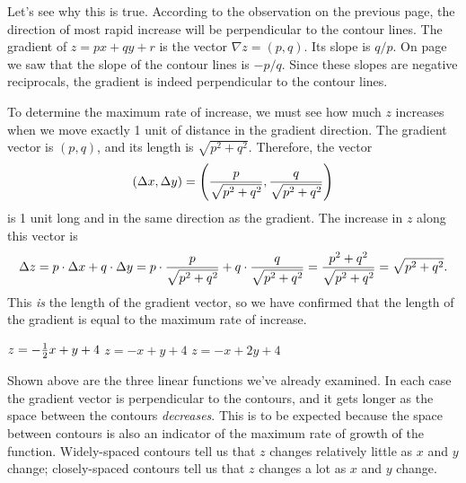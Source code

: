 {{{{\begin{center}
\end{center}

	Let's see why this is true.   
According to the observation on the previous page, the direction of most rapid increase will be perpendicular to the contour lines.  The gradient of $z = px + qy + r$ is the vector $\nabla z = (p, q)$.  Its slope is $q/p$.  On page~\pageref{contourslope} we saw that the slope of the contour lines is $-p/q$.  Since these slopes are negative reciprocals, the gradient is indeed perpendicular to the contour lines.
\label{grad}   

	To determine the maximum rate of increase, we must see how much $z$ increases when we move exactly 1 unit of distance in the gradient direction.  The gradient vector is $(p, q)$, and its length is $\sqrt{p^2 + q^2}$.  Therefore, the vector
	\[
(\Delta x, \Delta y) = 
	\left( {p \over \sqrt{p^2 + q^2}}, {q \over \sqrt{p^2 + q^2}} \right)
\]
is 1 unit long and in the same direction as the gradient.  The increase in $z$ along this vector is
	\[
\Delta z = p \cdot \Delta x + q \cdot \Delta y =
	p \cdot {p \over \sqrt{p^2 + q^2}} + q \cdot {q \over \sqrt{p^2 + q^2}}
	= {p^2 + q^2 \over \sqrt{p^2 + q^2}} = \sqrt{p^2 + q^2}.
\]
This {\em is\/} the length of the gradient vector, 
so we have confirmed that the length of the gradient is equal to the maximum rate of increase.
	
\vspace{13pt}	
\vspace{138pt}

{\small
	\noindent
	\hspace{-33pt}
	$z = -{\textstyle {1 \over 2}} x  + y + 4$
	\hspace{63pt}
	$z = -x + y + 4$
	\hspace{65pt}
	\mbox{$z = -x + 2y + 4$}
}
\vspace{6pt} 

	Shown above are the three linear functions we've already examined.  In each case the gradient vector is perpendicular to the contours, 
and it gets longer as the space between the contours {\em decreases}.  This is to be expected because the space between contours is also an indicator of the maximum rate of growth of the function.  Widely-spaced contours tell us that $z$ changes relatively little as $x$ and $y$ change; closely-spaced contours tell us that $z$ changes a lot as $x$ and $y$ change.
\medskip
	
}}}}
